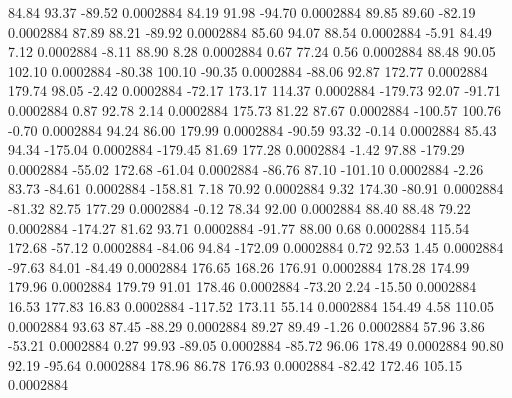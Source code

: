        84.84       93.37      -89.52     0.0002884
       84.19       91.98      -94.70     0.0002884
       89.85       89.60      -82.19     0.0002884
       87.89       88.21      -89.92     0.0002884
       85.60       94.07       88.54     0.0002884
       -5.91       84.49        7.12     0.0002884
       -8.11       88.90        8.28     0.0002884
        0.67       77.24        0.56     0.0002884
       88.48       90.05      102.10     0.0002884
      -80.38      100.10      -90.35     0.0002884
      -88.06       92.87      172.77     0.0002884
      179.74       98.05       -2.42     0.0002884
      -72.17      173.17      114.37     0.0002884
     -179.73       92.07      -91.71     0.0002884
        0.87       92.78        2.14     0.0002884
      175.73       81.22       87.67     0.0002884
     -100.57      100.76       -0.70     0.0002884
       94.24       86.00      179.99     0.0002884
      -90.59       93.32       -0.14     0.0002884
       85.43       94.34     -175.04     0.0002884
     -179.45       81.69      177.28     0.0002884
       -1.42       97.88     -179.29     0.0002884
      -55.02      172.68      -61.04     0.0002884
      -86.76       87.10     -101.10     0.0002884
       -2.26       83.73      -84.61     0.0002884
     -158.81        7.18       70.92     0.0002884
        9.32      174.30      -80.91     0.0002884
      -81.32       82.75      177.29     0.0002884
       -0.12       78.34       92.00     0.0002884
       88.40       88.48       79.22     0.0002884
     -174.27       81.62       93.71     0.0002884
      -91.77       88.00        0.68     0.0002884
      115.54      172.68      -57.12     0.0002884
      -84.06       94.84     -172.09     0.0002884
        0.72       92.53        1.45     0.0002884
      -97.63       84.01      -84.49     0.0002884
      176.65      168.26      176.91     0.0002884
      178.28      174.99      179.96     0.0002884
      179.79       91.01      178.46     0.0002884
      -73.20        2.24      -15.50     0.0002884
       16.53      177.83       16.83     0.0002884
     -117.52      173.11       55.14     0.0002884
      154.49        4.58      110.05     0.0002884
       93.63       87.45      -88.29     0.0002884
       89.27       89.49       -1.26     0.0002884
       57.96        3.86      -53.21     0.0002884
        0.27       99.93      -89.05     0.0002884
      -85.72       96.06      178.49     0.0002884
       90.80       92.19      -95.64     0.0002884
      178.96       86.78      176.93     0.0002884
      -82.42      172.46      105.15     0.0002884
